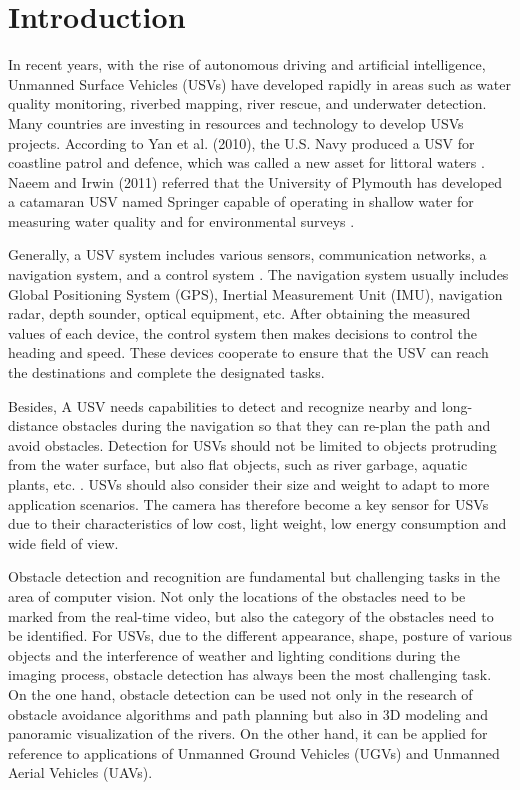 \documentclass[sensors,article,submit,moreauthors,pdftex]{Definitions/mdpi}
\begin{document}

\section{Introduction}

In recent years, with the rise of autonomous driving and artificial intelligence, Unmanned Surface Vehicles (USVs) have developed rapidly in areas such as water quality monitoring, riverbed mapping, river rescue, and underwater detection. Many countries are investing in resources and technology to develop USVs projects. According to Yan et al. (2010), the U.S. Navy produced a USV for coastline patrol and defence, which was called a new asset for littoral waters \cite{yan2010development}. Naeem and Irwin (2011) referred that the University of Plymouth has developed a catamaran USV named Springer capable of operating in shallow water for measuring water quality and for environmental surveys \cite{naeem2011evasive}.

Generally, a USV system includes various sensors, communication networks, a navigation system, and a control system \cite{casalino2009three}. The navigation system usually includes Global Positioning System (GPS), Inertial Measurement Unit (IMU), navigation radar, depth sounder, optical equipment, etc. After obtaining the measured values of each device, the control system then makes decisions to control the heading and speed. These devices cooperate to ensure that the USV can reach the destinations and complete the designated tasks.

Besides, A USV needs capabilities to detect and recognize nearby and long-distance obstacles during the navigation so that they can re-plan the path and avoid obstacles. Detection for USVs should not be limited to objects protruding from the water surface, but also flat objects, such as river garbage, aquatic plants, etc. \cite{7073635}. USVs should also consider their size and weight to adapt to more application scenarios. The camera has therefore become a key sensor for USVs due to their characteristics of low cost, light weight, low energy consumption and wide field of view.

Obstacle detection and recognition are fundamental but challenging tasks in the area of computer vision. Not only the locations of the obstacles need to be marked from the real-time video, but also the category of the obstacles need to be identified. For USVs, due to the different appearance, shape, posture of various objects and the interference of weather and lighting conditions during the imaging process, obstacle detection has always been the most challenging task. On the one hand, obstacle detection can be used not only in the research of obstacle avoidance algorithms and path planning but also in 3D modeling and panoramic visualization of the rivers. On the other hand, it can be applied for reference to applications of Unmanned Ground Vehicles (UGVs) and Unmanned Aerial Vehicles (UAVs).
\end{document}

